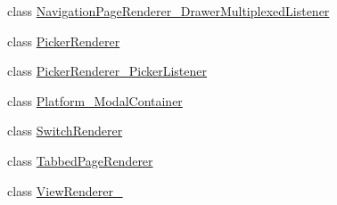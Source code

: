 \begin{CompactItemize}
\item 
class \hyperlink{classmd5270abb39e60627f0f200893b490a1ade_1_1_navigation_page_renderer___drawer_multiplexed_listener}{NavigationPageRenderer\_\-DrawerMultiplexedListener}
\item 
class \hyperlink{classmd5270abb39e60627f0f200893b490a1ade_1_1_picker_renderer}{PickerRenderer}
\item 
class \hyperlink{classmd5270abb39e60627f0f200893b490a1ade_1_1_picker_renderer___picker_listener}{PickerRenderer\_\-PickerListener}
\item 
class \hyperlink{classmd5270abb39e60627f0f200893b490a1ade_1_1_platform___modal_container}{Platform\_\-ModalContainer}
\item 
class \hyperlink{classmd5270abb39e60627f0f200893b490a1ade_1_1_switch_renderer}{SwitchRenderer}
\item 
class \hyperlink{classmd5270abb39e60627f0f200893b490a1ade_1_1_tabbed_page_renderer}{TabbedPageRenderer}
\item 
class \hyperlink{classmd5270abb39e60627f0f200893b490a1ade_1_1_view_renderer__2}{ViewRenderer\_}
\end{CompactItemize}
